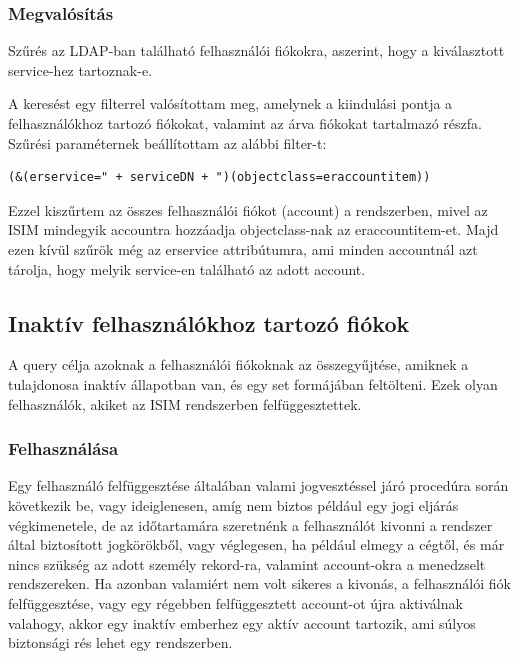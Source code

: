 	\subsubsection{Megvalósítás}
		Szűrés az LDAP-ban található felhasználói fiókokra, aszerint, hogy a kiválasztott service-hez tartoznak-e.
		
		A keresést egy filterrel valósítottam meg, amelynek a kiindulási pontja a felhasználókhoz tartozó fiókokat, valamint az árva fiókokat tartalmazó részfa. Szűrési paraméternek beállítottam az alábbi filter-t: 
\begin{lstlisting}
(&(erservice=" + serviceDN + ")(objectclass=eraccountitem))
\end{lstlisting}
	Ezzel kiszűrtem az összes felhasználói fiókot (account) a rendszerben, mivel az ISIM mindegyik accountra hozzáadja objectclass-nak az eraccountitem-et. Majd ezen kívül szűrök még az erservice attribútumra, ami minden accountnál azt tárolja, hogy melyik service-en található az adott account.
	
	
\subsection{Inaktív felhasználókhoz tartozó fiókok}
	A query célja azoknak a felhasználói fiókoknak az összegyűjtése, amiknek a tulajdonosa inaktív állapotban van, és egy set formájában feltölteni. Ezek olyan felhasználók, akiket az ISIM rendszerben felfüggesztettek.
	\subsubsection{Felhasználása}
	
		Egy felhasználó felfüggesztése általában valami jogvesztéssel járó procedúra során következik be, vagy ideiglenesen, amíg nem biztos például egy jogi eljárás végkimenetele, de az időtartamára szeretnénk a felhasználót kivonni a rendszer által biztosított jogkörökből, vagy véglegesen, ha például elmegy a cégtől, és már nincs szükség az adott személy rekord-ra, valamint account-okra a menedzselt rendszereken.
		Ha azonban valamiért nem volt sikeres a kivonás, a felhasználói fiók felfüggesztése, vagy egy régebben felfüggesztett account-ot újra aktiválnak valahogy, akkor egy inaktív emberhez egy aktív account tartozik, ami súlyos biztonsági rés lehet egy rendszerben.

